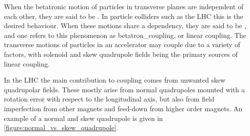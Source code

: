 When the betatronic motion of particles in transverse planes are independent of each other, they are said to be .
In particle colliders such as the \gls{LHC} this is the desired behaviour.
When these motions share a dependency, they are said to be , and one refers to this phenomenon as \gls{betatron_coupling}, or linear coupling.
The transverse motions of particles in an accelerator may couple due to a variety of factors, with solenoid and \gls{skew} quadrupole fields being the primary sources of linear coupling.

In the \gls{LHC} the main contribution to coupling comes from unwanted \gls{skew} quadrupolar fields.
These mostly arise from \gls{normal} quadrupoles mounted with a rotation error with respect to the longitudinal axis, but also from field imperfection from other magnets and feed-down from higher order magnets.
An example of a normal and skew quadrupole is given in \cref{figure:normal_vs_skew_quadrupole}.

